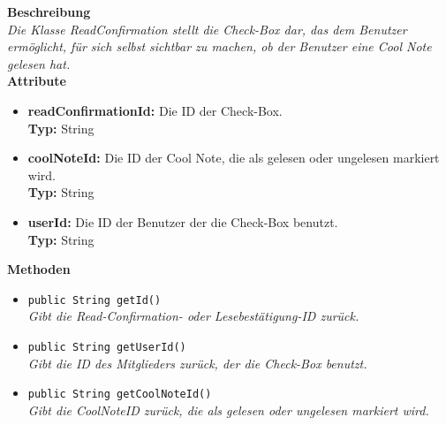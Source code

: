 	\textbf{Beschreibung} \\
	\textit{Die Klasse ReadConfirmation stellt die Check-Box dar, das dem Benutzer ermöglicht, für sich selbst sichtbar zu machen, ob der Benutzer eine Cool Note gelesen hat.} \\
	
	\textbf{Attribute}
	\begin{itemize}
		\item \textbf{readConfirmationId:} Die ID der Check-Box. \\
		\textbf{Typ:} String
		\item \textbf{coolNoteId:} Die ID der Cool Note, die als gelesen oder ungelesen markiert wird. \\
		\textbf{Typ:} String
		\item \textbf{userId:} Die ID der Benutzer der die Check-Box benutzt. \\
		\textbf{Typ:} String
	\end{itemize}
	
	\textbf{Methoden}
	\begin{itemize}
		\item\texttt{{public String getId()}}\\
		\textit{Gibt die Read-Confirmation- oder Lesebestätigung-ID zurück.}\\
		
		\item\texttt{{public String getUserId()}}\\
		\textit{Gibt die ID des Mitglieders zurück, der die Check-Box benutzt.}\\
		
		\item\texttt{{public String getCoolNoteId()}}\\
		\textit{Gibt die CoolNoteID zurück, die als gelesen oder ungelesen markiert wird.}\\
	\end{itemize}
